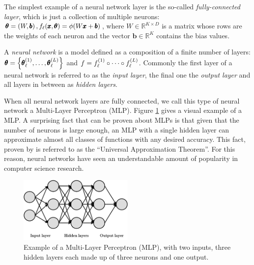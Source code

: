 The simplest example of a neural network layer is the so-called \emph{fully-connected layer}, which is just a collection of multiple neurons: $\pmb{\theta}=\mathopen{}\left(W, \pmb{b}\right), f_{\ell}\mathopen{}\left(\pmb{x}, \pmb{\theta}\right) = \phi\mathopen{}\left(W\pmb{x} + \pmb{b}\right)$, where $W \in \mathbb{R}^{K \times D}$ is a matrix whose rows are the weights of each neuron and the vector $\pmb{b} \in \mathbb{R}^K$ contains the bias values.

\begin{definition}
A \emph{neural network} is a model defined as a composition of a finite number of layers: $\pmb{\theta}=\mathopen{}\left\{\pmb{\theta}_{\ell}^{\mathopen{}\left(1\right)},\dots,\pmb{\theta}_{\ell}^{\mathopen{}\left(L\right)}\right\}$ and $f = f_{\ell}^{\mathopen{}\left(1\right)} \circ \dots \circ f_{\ell}^{\mathopen{}\left(L\right)}$. Commonly the first layer of a neural network is referred to as the \emph{input layer}, the final one the \emph{output layer} and all layers in between as \emph{hidden layers}. 
\end{definition}

When all neural network layers are fully connected, we call this type of neural network a Multi-Layer Perceptron (MLP). Figure \ref{fig:mlp_example} gives a visual example of a MLP. A surprising fact that can be proven about MLPs is that given that the number of neurons is large enough, an MLP with a single hidden layer can approximate almost all classes of functions with any desired accuracy. This fact, proven by \cite{hornik_multilayer_1989} is referred to as the \enquote{Universal Approximation Theorem}. For this reason, neural networks have seen an understandable amount of popularity in computer science research.

\begin{figure}[H]
\centering
\includegraphics[width=0.5\textwidth]{figures/background/mlp_example}
\caption[Example of a Multi-Layer Perceptron (MLP).]{Example of a Multi-Layer Perceptron (MLP), with two inputs, three hidden layers each made up of three neurons and one output.}
\label{fig:mlp_example}
\end{figure}

